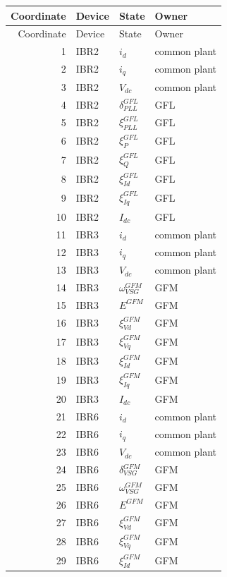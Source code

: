 \begin{longtable}{@{}r l l l@{}}
\toprule
Coordinate & Device & State & Owner \\ \midrule
\endfirsthead
\toprule
Coordinate & Device & State & Owner \\ \midrule
\endhead
1 & IBR2 & $i_d$ & common plant \\ 
2 & IBR2 & $i_q$ & common plant \\ 
3 & IBR2 & $V_{dc}$ & common plant \\ 
4 & IBR2 & $\delta_{PLL}^{GFL}$ & GFL \\ 
5 & IBR2 & $\xi_{PLL}^{GFL}$ & GFL \\ 
6 & IBR2 & $\xi_{P}^{GFL}$ & GFL \\ 
7 & IBR2 & $\xi_{Q}^{GFL}$ & GFL \\ 
8 & IBR2 & $\xi_{Id}^{GFL}$ & GFL \\ 
9 & IBR2 & $\xi_{Iq}^{GFL}$ & GFL \\ 
10 & IBR2 & $I_{dc}$ & GFL \\ 
11 & IBR3 & $i_d$ & common plant \\ 
12 & IBR3 & $i_q$ & common plant \\ 
13 & IBR3 & $V_{dc}$ & common plant \\ 
14 & IBR3 & $\omega_{VSG}^{GFM}$ & GFM \\ 
15 & IBR3 & $E^{GFM}$ & GFM \\ 
16 & IBR3 & $\xi_{Vd}^{GFM}$ & GFM \\ 
17 & IBR3 & $\xi_{Vq}^{GFM}$ & GFM \\ 
18 & IBR3 & $\xi_{Id}^{GFM}$ & GFM \\ 
19 & IBR3 & $\xi_{Iq}^{GFM}$ & GFM \\ 
20 & IBR3 & $I_{dc}$ & GFM \\ 
21 & IBR6 & $i_d$ & common plant \\ 
22 & IBR6 & $i_q$ & common plant \\ 
23 & IBR6 & $V_{dc}$ & common plant \\ 
24 & IBR6 & $\delta_{VSG}^{GFM}$ & GFM \\ 
25 & IBR6 & $\omega_{VSG}^{GFM}$ & GFM \\ 
26 & IBR6 & $E^{GFM}$ & GFM \\ 
27 & IBR6 & $\xi_{Vd}^{GFM}$ & GFM \\ 
28 & IBR6 & $\xi_{Vq}^{GFM}$ & GFM \\ 
29 & IBR6 & $\xi_{Id}^{GFM}$ & GFM \\ 

\end{longtable}
